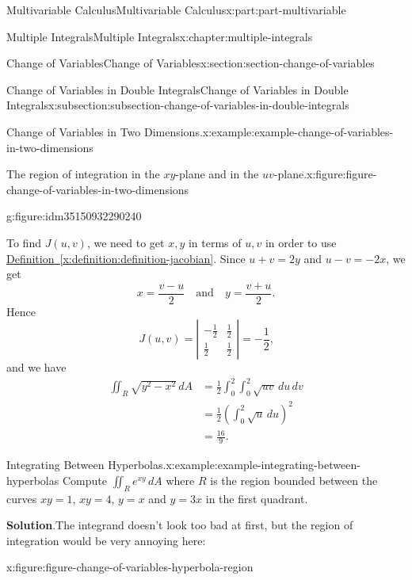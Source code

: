 \documentclass[twoside,10pt,]{book}
\newcommand{\blocktitlefont}{\relax}
\newcommand{\xreffont}{\relax}
\numberwithin{equation}{part}
\newcommand{\qq}[1]{\quad\text{#1}\quad}
\newcommand{\amp}{&}
\begin{document}
\begin{partptx}{Multivariable Calculus}{}{Multivariable Calculus}{}{}{x:part:part-multivariable}
\begin{chapterptx}{Multiple Integrals}{}{Multiple Integrals}{}{}{x:chapter:multiple-integrals}
\begin{sectionptx}{Change of Variables}{}{Change of Variables}{}{}{x:section:section-change-of-variables}
\begin{subsectionptx}{Change of Variables in Double Integrals}{}{Change of Variables in Double Integrals}{}{}{x:subsection:subsection-change-of-variables-in-double-integrals}
\begin{example}{Change of Variables in Two Dimensions.}{x:example:example-change-of-variables-in-two-dimensions}
\begin{figureptx}{The region of integration in the \(xy\)-plane and in the \(uv\)-plane.}{x:figure:figure-change-of-variables-in-two-dimensions}{}
\begin{sidebyside}{2}{0}{0}{0}
\begin{sbspanel}{0.5}
\begin{subfigureptx}{}{g:figure:idm35150932290240}{}
{
}%
\tcblower
\end{subfigureptx}%
\end{sbspanel}%
\end{sidebyside}%
\tcblower
\end{figureptx}%
To find \(J(u,v)\), we need to get \(x,y\) in terms of \(u,v\) in order to use \hyperref[x:definition:definition-jacobian]{Definition~{\xreffont\ref{x:definition:definition-jacobian}}}. Since \(u + v = 2y\) and \(u - v = -2x\), we get%
\begin{equation*}
x = \frac{v - u}{2} \qq{and} y = \frac{v + u}{2}\text{.}
\end{equation*}
Hence%
\begin{equation*}
J(u,v) = \left|\begin{array}{cc}-\frac{1}{2} \amp \frac{1}{2} \\ \frac{1}{2} \amp \frac{1}{2}\end{array}\right| = -\frac{1}{2}\text{,}
\end{equation*}
and we have%
\begin{align*}
\iint_{R}\sqrt{y^{2} - x^{2}}\,dA \amp = \frac{1}{2}\int_{0}^{2}\int_{0}^{2}\sqrt{uv}\,du\,dv \\
\amp = \frac{1}{2}\left(\int_{0}^{2}\sqrt{u}\,du\right)^{2} \\
\amp = \frac{16}{9} \text{.}
\end{align*}
%
\end{example}
\begin{example}{Integrating Between Hyperbolas.}{x:example:example-integrating-between-hyperbolas}%
Compute \(\iint_{R}e^{xy}\,dA\) where \(R\) is the region bounded between the curves \(xy = 1\), \(xy = 4\), \(y = x\) and \(y = 3x\) in the first quadrant.%
\par\smallskip%
\noindent\textbf{\blocktitlefont Solution}.\hypertarget{g:solution:idm35150932281664}{}\quad{}The integrand doesn't look too bad at first, but the region of integration would be very annoying here:%
\begin{figureptx}{}{x:figure:figure-change-of-variables-hyperbola-region}{}%

\end{figureptx}
\end{example}
\end{subsectionptx}
\end{sectionptx}
\end{chapterptx}
\end{partptx}
\end{document}
